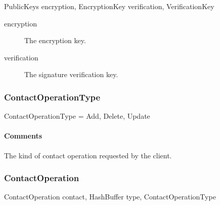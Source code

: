 \documentclass[a4paper,10pt]{article}
\begin{document}
\begin{verbbox}
PublicKeys
{
  encryption, EncryptionKey
  verification, VerificationKey
}
\end{verbbox}
\begin{center}
\theverbbox
\end{center}

\begin{inparaitem}[ ]
 \item \infrastructure
\end{inparaitem}

\SpecialItem
\begin{description}
 \item[encryption] The encryption key.
 \item[verification] The signature verification key.
\end{description}

\subsubsection{ContactOperationType}

\begin{verbbox}
ContactOperationType = { Add, Delete, Update }
\end{verbbox}
\begin{center}
\theverbbox
\end{center}

\begin{inparaitem}[ ]
 \item \infrastructure
\end{inparaitem}

\paragraph*{Comments}
The kind of contact operation requested by the client.

\subsubsection{ContactOperation}

\begin{verbbox}
ContactOperation
{
  contact, HashBuffer
  type, ContactOperationType
}
\end{verbbox}
\begin{center}
\theverbbox
\end{center}

\begin{inparaitem}[ ]
 \item \infrastructure
\end{inparaitem}
\end{document}
